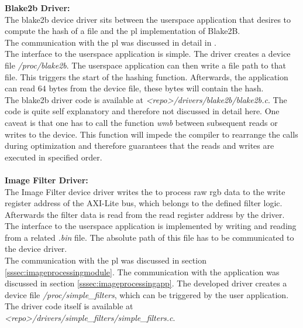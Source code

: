 
\textbf{Blake2b Driver:}\\
The blake2b device driver sits between the userspace application that desires to
compute the hash of a file and the \gls{pl} implementation of Blake2B.\\
The communication with the \gls{pl} was discussed in detail in
.\\
The interface to the userspace application is simple.
The driver creates a device file \emph{/proc/blake2b}.
The userspace application can then write a file path to that file.
This triggers the start of the hashing function.
Afterwards, the application can read $64$ bytes from the device file, these
bytes will contain the hash.\\
The blake2b driver code is available at \emph{<repo>/drivers/blake2b/blake2b.c}.
The code is quite self explanatory and therefore not discussed in detail here.
One caveat is that one has to call the function \emph{wmb} between subsequent
reads or writes to the device.
This function will impede the compiler to rearrange the calls during
optimization and therefore guarantees that the reads and writes are executed in
specified order.
\\\\
\textbf{Image Filter Driver:}\\
The Image Filter device driver writes the to process raw \gls{rgb} data to the write register address of the AXI-Lite bus, which belongs to the defined filter logic. Afterwards the filter data is read from the read register address by the driver. The interface to the userspace application is implemented by writing and reading from a related \emph{.bin} file. The absolute path of this file has to be communicated to the device driver.\\
The communication with the \gls{pl} was discussed in section \ref{sssec:imageprocessingmodule}. The communication with the application was discussed in section \ref{sssec:imageprocessingapp}. The developed driver creates a device file \emph{/proc/simple_filters}, which can be triggered by the user application. The driver code itself is available at \emph{<repo>/drivers/simple_filters/simple_filters.c}.
